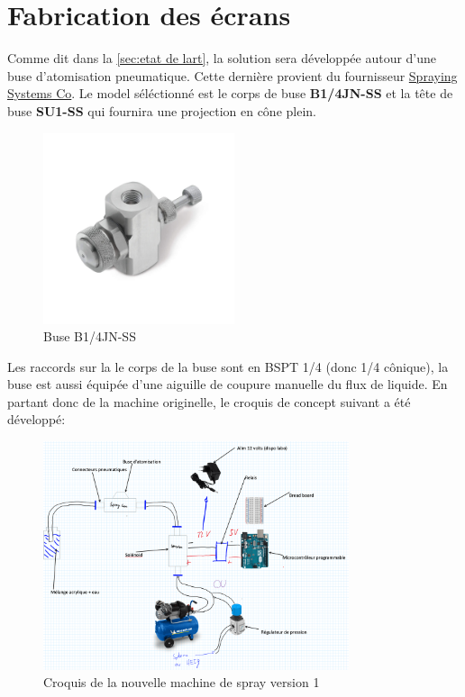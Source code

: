 \section{Fabrication des écrans}
Comme dit dans la \autoref{sec:etat de lart}, la solution sera développée autour d'une buse d'atomisation pneumatique.
Cette dernière provient du fournisseur \href{https://www.spray.com/fr-eu}{Spraying Systems Co}\footnotemark.
Le model séléctionné est le corps de buse \textbf{B1/4JN-SS} et la tête de buse \textbf{SU1-SS } qui fournira une projection en cône plein.
\begin{figure}[H]
    \centering
    \includegraphics[width = 0.5\textwidth]{assets/figures/ameliorations/J_Series_1_8JN_and_1_4JN.jpeg}
    \caption[Buse B1/4JN-SS]{Buse B1/4JN-SS \cite{image_buse_spray_com}}
\end{figure}
Les raccords sur la le corps de la buse sont en BSPT 1/4 (donc 1/4 cônique), la buse est aussi équipée d'une aiguille de coupure manuelle du flux de liquide.
En partant donc de la machine originelle, le croquis de concept suivant a été développé:
\begin{figure}[H]
    \centering
    \includegraphics[width = 0.8\textwidth]{assets/figures/ameliorations/Croquis_machine_ecran_ver_1.png}
    \caption[Croquis nouvelle machine de spray ver. 1]{Croquis de la nouvelle machine de spray version 1}
\end{figure}

